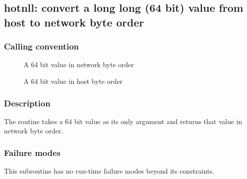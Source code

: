 \clearpage
{}
{}
\label{subr:htonll}
\subsection*{hotnll: convert a long long (64 bit) value from host to  network byte order}

\subsubsection*{Calling convention}

\begin{description}
\item[] A 64 bit value in network byte order
\item[] A 64 bit value in host byte order
\end{description}

\subsubsection*{Description}

The  routine takes a 64 bit value as its only
argument and returns that value in network byte order.

\subsubsection*{Failure modes}

This subroutine has no run-time failure modes beyond its constraints.
